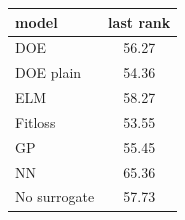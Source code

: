 \begin{tabular}{|lc|}
\hline
model & last rank\\
\hline
DOE & 56.27 \\
DOE plain & 54.36 \\
ELM & 58.27 \\
Fitloss & 53.55 \\
GP & 55.45 \\
NN & 65.36 \\
No surrogate & 57.73 \\
\hline
\end{tabular}
